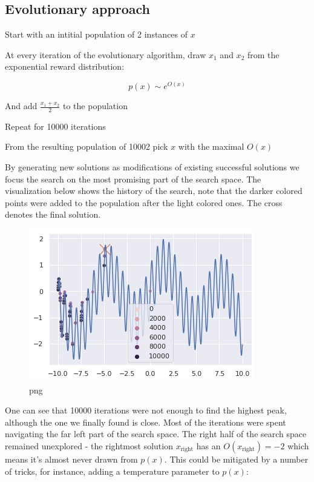 \subsection{Evolutionary approach}

Start with an intitial population of 2 instances of $ x $

At every iteration of the evolutionary algorithm, draw $ x_1 $ and $ x_2 $ from the exponential reward distribution:

\begin{equation}
p(x) \sim e^{O(x)}
\end{equation}

And add $ \frac{x_1 + x_2}{2} $ to the population

Repeat for 10000 iterations


From the resulting population of 10002 pick $ x $ with the maximal $ O(x) $



By generating new solutions as modifications of existing successful solutions we focus the search on the most promising part of the search space. The visualization below shows the history of the search, note that the darker colored points were added to the population after the light colored ones. The cross denotes the final solution.


    
\begin{figure}
    \centering
    \includegraphics[width=0.8\linewidth]{images/neuropt2.png}
    \caption{png}
\end{figure}

One can see that 10000 iterations were not enough to find the highest peak, although the one we finally found is close. Most of the iterations were spent navigating the far left part of the search space. The right half of the search space remained unexplored - the rightmost solution $ x_\text{right} $ has an $ O(x_\text{right})=-2 $ which means it's almost never drawn from $ p(x) $. This could be mitigated by a number of tricks, for instance, adding a temperature parameter to $ p(x) $:

